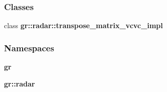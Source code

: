 \subsubsection*{Classes}
\begin{DoxyCompactItemize}
\item 
class {\bf gr\+::radar\+::transpose\+\_\+matrix\+\_\+vcvc\+\_\+impl}
\end{DoxyCompactItemize}
\subsubsection*{Namespaces}
\begin{DoxyCompactItemize}
\item 
 {\bf gr}
\item 
 {\bf gr\+::radar}
\end{DoxyCompactItemize}
